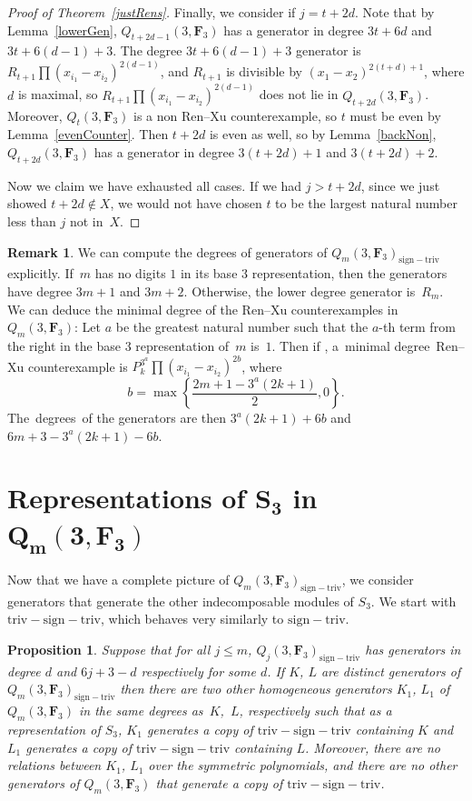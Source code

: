 \documentclass[pdftex]{sigma}
\newtheorem{Proposition}[Theorem]{Proposition}
\theoremstyle{definition}
\newtheorem{Remark}[Theorem]{Remark}
\numberwithin{equation}{section}
\newcommand{\trix}{\mathrm{triv-sign-triv}}
\newcommand{\siv}{\mathrm{sign-triv}}
\begin{document}
\begin{proof}[Proof of Theorem~\ref{justRens}]
 Finally, we consider if $j=t+2d$. Note that by Lemma~\ref{lowerGen}, $Q_{t+2d-1}(3,\mathbf{F}_3)$ has a generator in degree $3t+6d$ and $3t+6(d-1)+3$. The degree $3t+6(d-1)+3$ generator is $R_{t+1}\prod (x_{i_1}-x_{i_2})^{2(d-1)}$, and $R_{t+1}$ is divisible by $(x_1-x_2)^{2(t+d)+1}$, where $d$ is maximal, so $R_{t+1}\prod (x_{i_1}-x_{i_2})^{2(d-1)}$ does not lie in $Q_{t+2d}(3,\mathbf{F}_3)$. Moreover, $Q_{t}(3,\mathbf{F}_3)$ is a non Ren--Xu counterexample, so $t$ must be even by Lemma~\ref{evenCounter}. Then $t+2d$ is even as well, so by Lemma~\ref{backNon}, $Q_{t+2d}(3,\mathbf{F}_3)$ has a generator in degree $3(t+2d)+1$ and $3(t+2d)+2$.

 Now we claim we have exhausted all cases. If we had $j>t+2d$, since we just showed ${t+2d\not\in X}$, we would not have chosen $t$ to be the largest natural number less than $j$ not in~$X$.
\end{proof}

\begin{Remark}
 We can compute the degrees of generators of $Q_m(3,\mathbf{F}_3)_{\siv}$ explicitly. If~$m$ has no digits $1$ in its base $3$ representation, then the generators have degree $3m+1$ and $3m+2$. Otherwise, the lower degree generator is~$R_m$. We can deduce the minimal degree of the \mbox{Ren--Xu} counterexamples in $Q_m(3,\mathbf{F}_3)$: Let $a$ be the greatest natural number such that the $a$-th term from the right in the base $3$ representation of~$m$ is~$1$. Then if , \mbox{a~minimal} deg\-ree~Ren--Xu counterexample is $P_k^{3^a}\prod(x_{i_1}-x_{i_2})^{2b}$, where
 \[
 b=\max\left\{\frac{2m+1-3^a(2k+1)}{2},0\right\}.
 \]
 The~deg\-rees~of the generators are then $3^a(2k+1)+6b$ and $6m+3-3^a(2k+1)-6b$.
\end{Remark}

\section[Representations of S\_3 in Q\_m(3,F)]{Representations of $\boldsymbol{S_3}$ in $\boldsymbol{Q_m(3,\mathbf{F}_3)}$}\label{sec:reps}

Now that we have a complete picture of $Q_m(3,\mathbf{F}_3)_\siv$, we consider generators that generate the other indecomposable modules of $S_3$. We start with $\trix$, which behaves very similarly to $\siv$.

 \begin{Proposition}\label{prop:trix}
 Suppose that for all $j\leq m$, $Q_j(3,\mathbf{F}_3)_\siv$ has generators in degree $d$ and $6j+3-d$ respectively for some $d$. If $K$, $L$ are distinct generators of $Q_m(3,\mathbf{F}_3)_\siv$ then there are two other homogeneous generators $K_1$, $L_1$ of $Q_m(3,\mathbf{F}_3)$ in the same degrees as~$K$,~$L$, respectively such that as a representation of $S_3$, $K_1$ generates a copy of $\trix$ containing $K$ and $L_1$ generates a copy of $\trix$ containing $L$. Moreover, there are no relations between $K_1$, $L_1$ over the symmetric polynomials, and there are no other generators of $Q_m(3,\mathbf{F}_3)$ that generate a copy of $\trix$.
 \end{Proposition}
\end{document}
